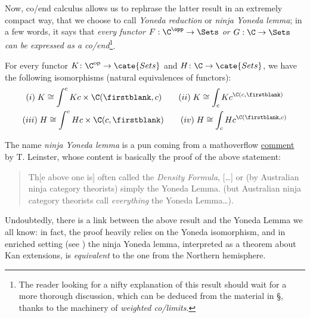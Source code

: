 Now, co/end calculus allows us to rephrase the latter result in an extremely compact way, that we choose to call \emph{Yoneda reduction} or \emph{ninja Yoneda lemma}; in a few words, it says that \emph{every functor $F : \C^\opp\to \Sets$ or $G : \C\to \Sets$ can be expressed as a co/end}\footnote{The reader looking for a nifty explanation of this result should wait for a more thorough discussion, which can be deduced from the material in \S{}, thanks to the machinery of \emph{weighted co/limits}.}.
\begin{proposition}\label{ninjayo}
For every functor $K\colon \C^\text{op}\to\cate{Sets}$ and $H\colon \C\to \cate{Sets}$, we have the following isomorphisms (natural equivalences of functors):
\begin{gather*}
(i)\; K\cong \int^cKc\times \C(\firstblank,c) \qquad (ii)\; K\cong \int_c Kc^{\C(c,\firstblank)}\\
(iii)\; H\cong \int^cHc\times \C(c,\firstblank) \qquad (iv)\; H\cong \int_cHc^{\C(\firstblank,c)}\\
\end{gather*}
\end{proposition}
\begin{remark}
The name \emph{ninja Yoneda lemma} is a pun coming from a mathoverflow \href{http://mathoverflow.net/a/20451}{comment} by T\@. Leinster, whose content is basically the proof of the above statement:
\begin{quote}\small 
Th[e above one is] often called the \emph{Density Formula}, [\dots] or (by Australian ninja category theorists) simply the Yoneda Lemma. (but Australian ninja category theorists call \emph{everything} the Yoneda Lemma\dots).
\end{quote}
\end{remark}
Undoubtedly, there is a link between the above result and the Yoneda Lemma we all know: in fact, the proof heavily relies on the Yoneda isomorphism, and in enriched setting (see \cite[\S\textbf{I.5}]{dubuc1970kan}) the ninja Yoneda lemma, interpreted as a theorem about Kan extensions, is \emph{equivalent} to the one from the Northern hemisphere. 

